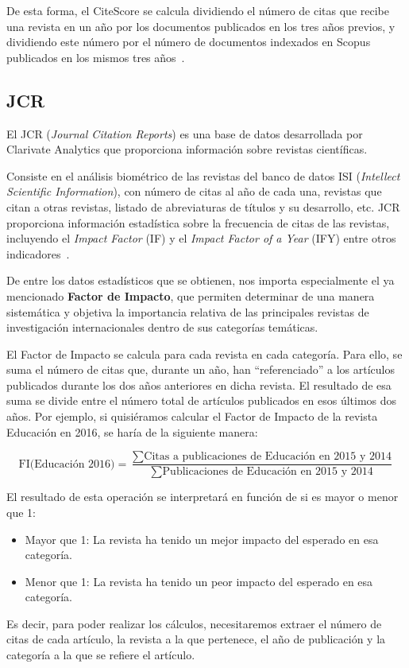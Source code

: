 De esta forma, el CiteScore se calcula dividiendo el número de citas que recibe una revista en un año por los documentos publicados en los tres años previos, y dividiendo este número por el número de documentos indexados en Scopus publicados en los mismos tres años~\cite{Svetla2022}. 


\subsection{JCR}
El JCR (\textit{Journal Citation Reports}) es una base de datos desarrollada por Clarivate Analytics que proporciona información sobre revistas científicas.

Consiste en el análisis biométrico de las revistas del banco de datos ISI (\textit{Intellect Scientific Information}), con número de citas al año de cada una, revistas que citan a otras revistas, listado de abreviaturas de títulos y su desarrollo, etc. JCR proporciona información estadística sobre la frecuencia de citas de las revistas, incluyendo el \textit{Impact Factor} (IF) y el \textit{Impact Factor of a Year} (IFY) entre otros indicadores~\cite{clarivate2019}. 

De entre los datos estadísticos que se obtienen, nos importa especialmente el ya mencionado \textbf{Factor de Impacto}, que permiten determinar de una manera sistemática y objetiva la importancia relativa de las principales revistas de investigación internacionales dentro de sus categorías temáticas. 

El Factor de Impacto se calcula para cada revista en cada categoría. Para ello, se suma el número de citas que, durante un año, han ``referenciado'' a los artículos publicados durante los dos años anteriores en dicha revista. El resultado de esa suma se divide entre el número total de artículos publicados en esos últimos dos años.
Por ejemplo, si quisiéramos calcular el Factor de Impacto de la revista Educación en 2016, se haría de la siguiente manera:

\[
\text{FI(Educación 2016)} = \frac{\sum \text{Citas a publicaciones de Educación en 2015 y 2014}}{\sum \text{Publicaciones de Educación en 2015 y 2014}}
\]

 
El resultado de esta operación se interpretará en función de si es mayor o menor que 1:
\begin{itemize}
	\item Mayor que 1: La revista ha tenido un mejor impacto del esperado en esa categoría.
	\item Menor que 1: La revista ha tenido un peor impacto del esperado en esa categoría.
\end{itemize}
Es decir, para poder realizar los cálculos, necesitaremos extraer el número de citas de cada artículo, la revista a la que pertenece, el año de publicación y la categoría a la que se refiere el artículo.


